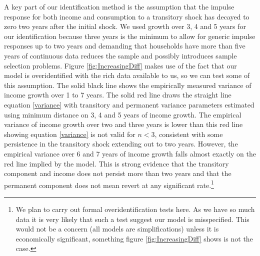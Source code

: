 \documentclass[titlepage]{\econtex}\newcommand{\texname}{IncomeUncertainty}
\begin{document}
A key part of our identification method is the assumption that the impulse response for both income and consumption to a transitory shock has decayed to zero two years after the initial shock. We used growth over 3, 4 and 5 years for our identification because three years is the minimum to allow for generic impulse responses up to two years and demanding that households have more than five years of continuous data reduces the sample and possibly introduces sample selection problems. Figure \ref{fig:IncreasingDiff} makes use of the fact that our model is overidentified with the rich data available to us, so we can test some of this assumption. The solid black line shows the empirically measured variance of income growth over 1 to 7 years. The solid red line draws the straight line equation \ref{variance} with transitory and permanent variance parameters estimated using minimum distance on 3, 4 and 5 years of income growth. The empirical variance of income growth over two and three years is lower than this red line showing equation \ref{variance} is not valid for $n < 3$, consistent with some persistence in the transitory shock extending out to two years. However, the empirical variance over 6 and 7 years of income growth falls almost exactly on the red line implied by the model. This is strong evidence that the transitory component and income does not persist more than two years and that the permanent component does not mean revert at any significant rate.\footnote{We plan to carry out formal overidentification tests here. As we have so much data it is very likely that such a test suggest our model is misspecified. This would not be a concern (all models are simplifications) unless it is economically significant, something figure \ref{fig:IncreasingDiff} shows is not the case.}
\end{document}
